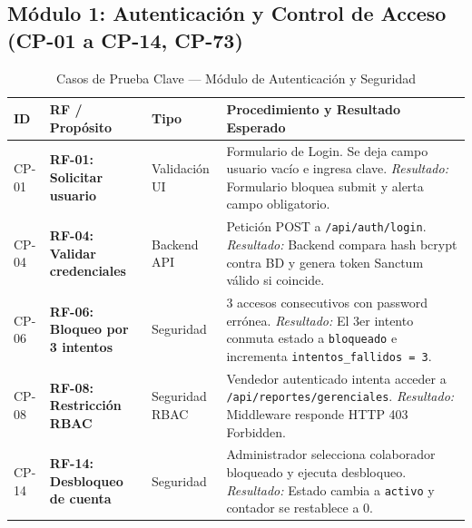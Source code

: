 \subsection{Módulo 1: Autenticación y Control de Acceso (CP-01 a CP-14, CP-73)}
\begin{table}[H]
\centering
\small
\begin{tabularx}{\textwidth}{>{\ttfamily\centering}p{1.4cm} >{\raggedright\bfseries}p{3.4cm} >{\raggedright}p{2.3cm} Y}
\toprule
\textbf{ID} & \textbf{RF / Propósito} & \textbf{Tipo} & \textbf{Procedimiento y Resultado Esperado} \\
\midrule
CP-01 & RF-01: Solicitar usuario & Validación UI & Formulario de Login. Se deja campo usuario vacío e ingresa clave. \textit{Resultado:} Formulario bloquea submit y alerta campo obligatorio. \\
\addlinespace
CP-04 & RF-04: Validar credenciales & Backend API & Petición POST a \texttt{/api/auth/login}. \textit{Resultado:} Backend compara hash bcrypt contra BD y genera token Sanctum válido si coincide. \\
\addlinespace
CP-06 & RF-06: Bloqueo por 3 intentos & Seguridad & 3 accesos consecutivos con password errónea. \textit{Resultado:} El 3er intento conmuta estado a \texttt{bloqueado} e incrementa \texttt{intentos\_fallidos = 3}. \\
\addlinespace
CP-08 & RF-08: Restricción RBAC & Seguridad RBAC & Vendedor autenticado intenta acceder a \texttt{/api/reportes/gerenciales}. \textit{Resultado:} Middleware responde HTTP 403 Forbidden. \\
\addlinespace
CP-14 & RF-14: Desbloqueo de cuenta & Seguridad & Administrador selecciona colaborador bloqueado y ejecuta desbloqueo. \textit{Resultado:} Estado cambia a \texttt{activo} y contador se restablece a 0. \\
\bottomrule
\end{tabularx}
\caption{Casos de Prueba Clave --- Módulo de Autenticación y Seguridad}
\label{tab:cp_modulo1}
\end{table}

